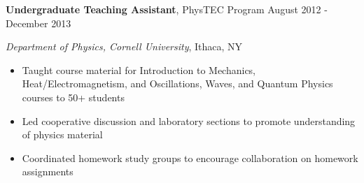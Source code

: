 
\vspace{7pt}

\textbf{Undergraduate Teaching Assistant}, PhysTEC Program \hfill August 2012 - December 2013

\textit{Department of Physics, Cornell University}, Ithaca, NY

\begin{itemize}
    \item Taught course material for Introduction to Mechanics, Heat/Electromagnetism, and Oscillations, Waves, and Quantum Physics courses to 50+ students
    \item Led cooperative discussion and laboratory sections to promote understanding of physics material
    \item Coordinated homework study groups to encourage collaboration on homework assignments
\end{itemize}
